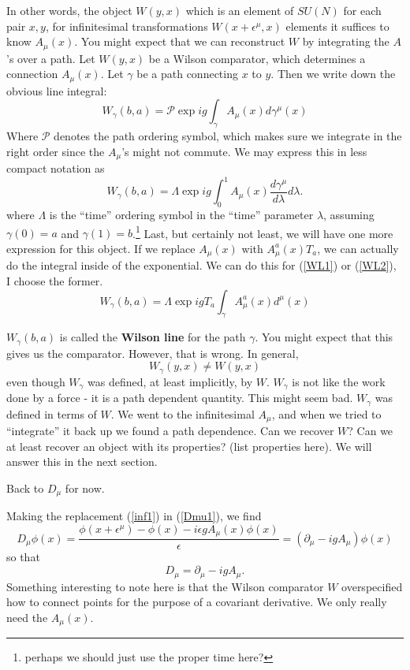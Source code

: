 \documentclass[main.tex]{subfiles}
\begin{document}
In other words, the object $W(y,x)$ which is an element of $SU(N)$ for each pair $x,y$, for infinitesimal transformations $W(x +\epsilon^\mu,x)$ elements it suffices to know $A_\mu (x)$. You might expect that we can reconstruct $W$ by integrating the $A$'s over a path. Let $W(y,x)$ be a Wilson comparator, which determines a connection $A_\mu (x)$. Let $\gamma$ be a path connecting $x$ to $y$. Then we write down the obvious line integral:
\begin{equation} \label{WL1}
W_\gamma (b,a) = \mathcal{P} \exp{ i g \int_{\gamma} A_\mu(x) d\gamma^\mu (x)}
\end{equation}
Where $\mathcal{P}$ denotes the path ordering symbol, which makes sure we  integrate in the right order since the $A_\mu$'s might not commute. We may express this in less compact notation as 
\begin{equation} \label{WL2}
W_\gamma (b,a) = \Lambda \exp{ i g \int_0^1 A_\mu (x) 
\frac{d \gamma^\mu}{d\lambda} d\lambda}.
\end{equation}
where $\Lambda$ is the ``time'' ordering symbol in the ``time'' parameter $\lambda$, assuming $\gamma(0) = a$ and $\gamma(1) = b$.\footnote{perhaps we should just use the proper time here?} Last, but certainly not least, we will have one more expression for this object. If we replace $A_\mu (x)$ with $A_\mu^a (x) T_a$, we can actually do the integral inside of the exponential. We can do this for (\ref{WL1}) or (\ref{WL2}), I choose the former.
\begin{equation} \label{WLT}
\boxed{W_\gamma (b,a) = \Lambda \exp{ ig T_a \int_\gamma A_\mu^a (x) d^\mu (x)}}
\end{equation}

$W_\gamma (b,a)$ is called the \textbf{Wilson line} for the path $\gamma$. You might expect that this gives us the comparator. However, that is wrong. In general,
\[
W_\gamma (y,x) \neq W(y,x)
\]
even though $W_\gamma$ was defined, at least implicitly, by $W$. $W_\gamma$ is not like the work done by a force - it is a path dependent quantity. This might seem bad. $W_\gamma$ was defined in terms of $W$. We went to the infinitesimal $A_\mu$, and when we tried to ``integrate'' it back up we found a path dependence. Can we recover $W$? Can we at least recover an object with its properties? (list properties here). We will answer this in the next section.

Back to $D_\mu$ for now.

Making the replacement (\ref{inf1}) in (\ref{Dmu1}), we find
\[
D_\mu \phi (x) = \frac{\phi(x + \epsilon^\mu) - \phi(x) - i \epsilon g A_\mu (x) \phi(x)}{\epsilon} = \left(
\partial_\mu - ig A_\mu 
\right) \phi(x)
\]
so that
\begin{equation} \label{Dmu2}
\boxed{D_\mu = \partial_\mu - i g A_\mu}.
\end{equation}
Something interesting to note here is that the Wilson comparator $W$ overspecified how to connect points for the purpose of a covariant derivative. We only really need the $A_\mu (x)$.
\end{document}
